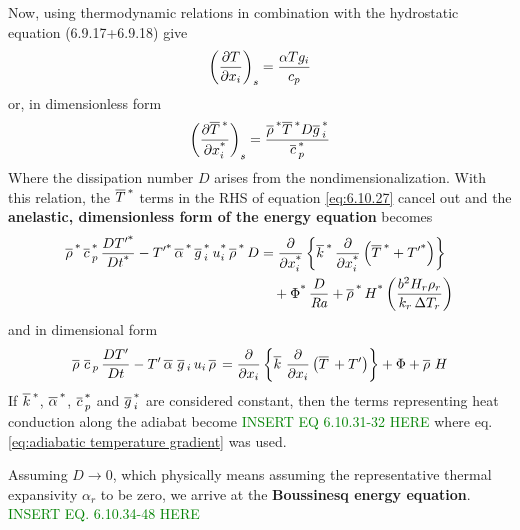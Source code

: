 \documentclass[document.tex]{subfiles}
\begin{document}
Now, using thermodynamic relations in combination with the hydrostatic equation (6.9.17+6.9.18) give 
\begin{equation}
    \left(\pdv{T}{x_i}\right)_s = \frac{\alpha T g_i}{c_p}
\end{equation}
or, in dimensionless form
\begin{equation}
    \label{eq:adiabatic temperature gradient}
    \left(\pdv{\nond{\refst{T}}}{\nond{x_i}}\right)_s = \frac{\nond{\refst{\rho}}\nond{\refst{T}}D \nond{\refst{g}}_i}{\nond{\refst{c}}_p}
\end{equation}
Where the dissipation number $D$ arises from the nondimensionalization. With this relation, the $\overline{T}\,^{\textup{*}}$ terms in the RHS of equation 
\ref{eq:6.10.27} cancel out and the \textbf{anelastic, dimensionless form of the energy equation} becomes
\begin{align}
  \overline{\rho}\,^{\textup{*}}\,\overline{c}\,_p^{\textup{*}}\,
    \frac{D T'^{\textup{*}}}{D t^{\textup{*}}}
    - T'^{\textup{*}}\,\overline{\alpha}\,^{\textup{*}}\,\overline{g}\,_i^{\textup{*}}\,u_i^{\textup{*}}\,
      \overline{\rho}\,^{\textup{*}}\, D
  &= \pdv{\ensuremath x_i^{\textup{*}}}
    \left\{ \overline{k}\,^{\textup{*}}\,\pdv{\ensuremath x_i^{\textup{*}}}
    \left( \overline{T}\,^{\textup{*}} + T'^{\textup{*}} \right) \right\}
    \nonumber \\
  &\quad + \Phi^{\textup{*}}\,\frac{D}{\mathit{Ra}}
    + \overline{\rho}\,^{\textup{*}}\,H^{\textup{*}}
    \left( \frac{b^2 H_r \rho_r}{k_r \, \Delta T_r} \right)
  \label{eq:6.10.29}
\end{align}
and in dimensional form 
\begin{equation}
  \overline{\rho}\,\,\overline{c}\,_p\,
    \frac{D T'}{D t}
    - T'\,\overline{\alpha}\,\,\overline{g}\,_i\,u_i\,\overline{\rho}\,
  = \pdv{x_i}
    \left\{ \overline{k}\,\,\pdv{x_i}
    \left( \overline{T}\, + T' \right) \right\}
    + \Phi + \overline{\rho}\,\,H
  \label{eq:6.10.30}
\end{equation}
If $\overline{k}\,^{\textup{*}}$, $\overline{\alpha}\,^{\textup{*}}$, $\overline{c}\,^{\textup{*}}_p$ and $\overline{g}\,^{\textup{*}}_i$ are considered constant, then the 
terms representing heat conduction along the adiabat become \textcolor{green}{INSERT EQ 6.10.31-32 HERE}
where eq. \ref{eq:adiabatic temperature gradient} was used. 

Assuming $D \to 0$, which physically means assuming the representative thermal expansivity $\alpha_r$ to be zero, 
we arrive at the \textbf{Boussinesq energy equation}. \textcolor{green}{INSERT EQ. 6.10.34-48 HERE }


\end{document}
